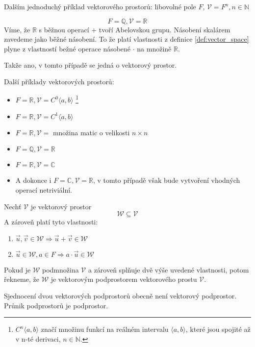 Dalším jednoduchý příklad vektorového prostorů:
libovolné pole $F$, $\mathcal{V} = F^n, n \in \mathbb{N}$

\begin{example}
    $$F = \mathbb{Q}, \mathcal{V} = \mathbb{R}$$
    Víme, že $\mathbb{R}$ s běžnou operací $+$ tvoří Abelovskou grupu.
    Násobení skalárem zavedeme jako běžné násobení.
    To že platí vlastnosti z definice \ref{def:vector_space} plyne z vlastností
    bežné operace násobené $\cdot$ na množině $\mathbb{R}$.

    Takže ano, v tomto případě se jedná o vektorový prostor.
\end{example}

Další příklady vektorových prostorů:
\begin{itemize}
    \item $F = \mathbb{R}, \mathcal{V} = C^0\langle a, b \rangle$
        \footnote{$C^n\langle a,b \rangle$ značí množinu funkcí na reálném intervalu
        $\langle a,b \rangle$, které jsou spojité až v n-té derivaci, $n \in \mathbb{N}$.}
    \item $F = \mathbb{R}, \mathcal{V} = C^1\langle a, b \rangle$
    \item $F = \mathbb{R}, \mathcal{V}=$ množina matic o velikosti $n \times n$
    \item $F = \mathbb{Q}, \mathcal{V} = \mathbb{R}$
    \item $F = \mathbb{R}, \mathcal{V} = \mathbb{C}$
    \item A dokonce i $F = \mathbb{C}, \mathcal{V} = \mathbb{R}$, v tomto případě však bude
        vytvoření vhodných operací netriviální.
\end{itemize}

\begin{definition}
    Nechť $\mathcal{V}$ je vektorový prostor
    $$\mathcal{W} \subseteq \mathcal{V}$$
    A zároveň platí tyto vlastnosti:
    \begin{enumerate}
        \item $\vec{u}, \vec{v} \in \mathcal{W} \Rightarrow \vec{u} + \vec{v} \in \mathcal{W}$
        \item $\vec{u} \in \mathcal{W}, a \in F \Rightarrow  a \cdot \vec{u} \in \mathcal{W}$
    \end{enumerate}

    Pokud je $\mathcal{W}$ podmnožina $\mathcal{V}$ a zároveň splňuje dvě výše uvedené vlastnosti,
    potom řekneme, že $\mathcal{W}$ je vektorovým podprostorem vektorového prostu $\mathcal{V}$.

    Sjednocení dvou vektorových podprostorů obecně není vektorový podprostor.
    Průnik podprostorů je podprostor.
\end{definition}

